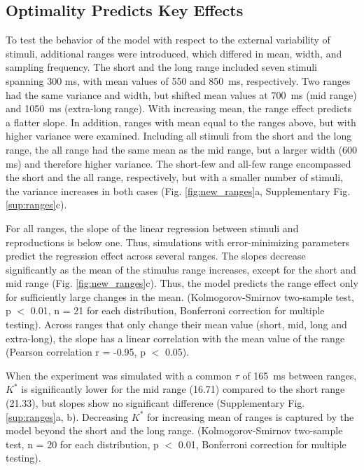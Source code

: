 \documentclass[10pt, a4paper]{article}
\begin{document}
\subsection{Optimality Predicts Key Effects}
To test the behavior of the model with respect to the external variability of stimuli, additional ranges were introduced, which differed in mean, width, and sampling frequency.
The short and the long range included seven stimuli spanning 300 ms, with mean values of 550 and 850~ms, respectively. 
Two ranges had the same variance and width, but shifted mean values at 700~ms (mid range) and 1050~ms (extra-long range). With increasing mean, the range effect predicts a flatter slope. 
In addition, ranges with mean equal to the ranges above, but with higher variance were examined.
Including all stimuli from the short and the long range, the all range had the same mean as the mid range, but a larger width (600 ms) and therefore higher variance.
The short-few and all-few range encompassed the short and the all range, respectively, but with a smaller number of stimuli, the variance increases in both cases 
(Fig. \ref{fig:new_ranges}a, Supplementary Fig. \ref{sup:ranges}c).

For all ranges, the slope of the linear regression between stimuli and reproductions is below one. Thus, simulations with error-minimizing parameters predict the regression effect across several ranges. 
The slopes decrease significantly as the mean of the stimulus range increases, except for the short and mid range (Fig. \ref{fig:new_ranges}c).
Thus, the model predicts the range effect only for sufficiently large changes in the mean. 
(Kolmogorov-Smirnov two-sample test, p $<$ 0.01, n = 21 for each distribution, Bonferroni correction for multiple testing).
Across ranges that only change their mean value (short, mid, long and extra-long), the slope has a linear correlation with the mean value of the range (Pearson correlation r = -0.95, p $<$ 0.05).

When the experiment was simulated with a common $\tau$ of 165~ms between ranges, $K^*$ is significantly lower for the mid range (16.71) compared to the short range (21.33), but slopes show no significant difference (Supplementary Fig. \ref{sup:ranges}a, b).
Decreasing $K^*$ for increasing mean of ranges is captured by the model beyond the short and the long range.
(Kolmogorov-Smirnov two-sample test, n = 20 for each distribution, p $<$ 0.01, Bonferroni correction for multiple testing).
\end{document}
